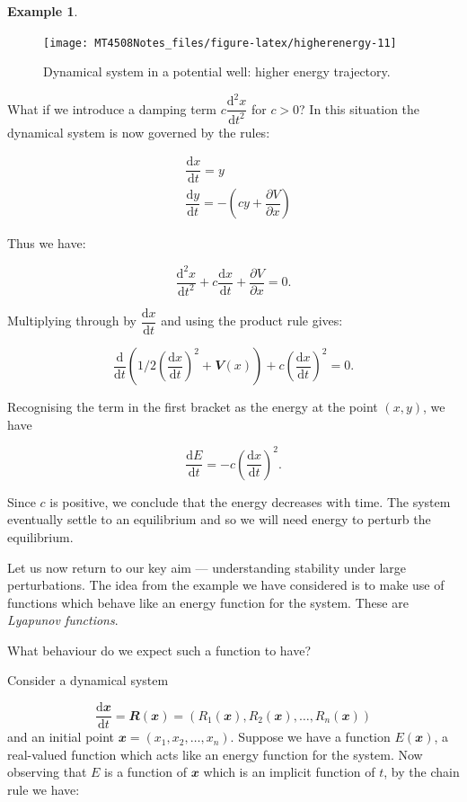 \documentclass[
  a4paper,
  oneside,
  final]{krantz}
\renewcommand{\d}{\mathrm{d}}
\renewcommand{\v}[1]{{\mathbfit{#1}}}
\newcommand{\pder}[2]{\dfrac{\partial #1}{\partial#2}}
\newcommand{\der}[2]{\dfrac{\d #1}{\d #2}}
\newcommand{\dern}[3]{\dfrac{\d^{#3} #1}{\d #2 ^{#3}}}
\theoremstyle{definition}
\theoremstyle{definition}
\newtheorem{example}{Example}[chapter]
\theoremstyle{definition}
\theoremstyle{definition}
\theoremstyle{remark}
\begin{document}
\begin{example}
\begin{figure}

{\centering \texttt{[image: MT4508Notes\_files/figure-latex/higherenergy-11]} 

}

\caption{Dynamical system in a potential well: higher energy trajectory.}\label{fig:higherenergy}
\end{figure}

What if we introduce a damping term \(c \dern{x}{t}{2}\) for \(c>0\)? In this situation the dynamical system is now governed by the rules:

\begin{align}
    &\der{x}{t} =  y \\
    &\der{y}{t} = - \left(c y +  \pder{V}{x}\right)
    \label{eq:potential-field-damped}
\end{align}

Thus we have:

\[ \dern{x}{t}{2} + c \der{x}{t} + \pder{V}{x} = 0.\]

Multiplying through by \(\der{x}{t}\) and using the product rule gives:

\[ \der{}{t} \left(1/2 \left(\der{x}{t}\right)^2   +  \v{V}(x) \right) + c \left( \der{x}{t}\right)^2 = 0.\]

Recognising the term in the first bracket as the energy at the point \((x,y)\), we have

\[ \der{E}{t} = -c \left( \der{x}{t}\right)^2.\]

Since \(c\) is positive, we conclude that the energy decreases with time. The system eventually settle to an equilibrium and so we will need energy to perturb the equilibrium.
\end{example}

Let us now return to our key aim --- understanding stability under large perturbations. The idea from the example we have considered is to make use of functions which behave like an energy function for the system. These are \emph{Lyapunov functions}.

What behaviour do we expect such a function to have?

Consider a dynamical system

\[ \der{\v{x}}{t} = \v{R}(\v{x}) = (R_1(\v{x}), R_2(\v{x}), \ldots, R_{n}(\v{x}))\]
and an initial point \(\v{x} = (x_1, x_2, \ldots, x_n)\). Suppose we have a function \(E(\v{x})\), a real-valued function which acts like an energy function for the system. Now observing that \(E\) is a function of \(\v{x}\) which is an implicit function of \(t\), by the chain rule we have:
\end{document}
